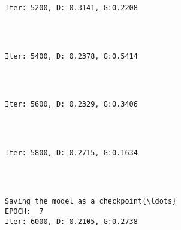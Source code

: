 \documentclass[11pt]{article}
\begin{document}
    \begin{Verbatim}[commandchars=\\\{\}]

Iter: 5200, D: 0.3141, G:0.2208
    \end{Verbatim}

    \begin{center}
    \end{center}
    { \hspace*{\fill} \\}
    
    \begin{Verbatim}[commandchars=\\\{\}]

Iter: 5400, D: 0.2378, G:0.5414
    \end{Verbatim}

    \begin{center}
    \end{center}
    { \hspace*{\fill} \\}
    
    \begin{Verbatim}[commandchars=\\\{\}]

Iter: 5600, D: 0.2329, G:0.3406
    \end{Verbatim}

    \begin{center}
    \end{center}
    { \hspace*{\fill} \\}
    
    \begin{Verbatim}[commandchars=\\\{\}]

Iter: 5800, D: 0.2715, G:0.1634
    \end{Verbatim}

    \begin{center}
    \end{center}
    { \hspace*{\fill} \\}
    
    \begin{Verbatim}[commandchars=\\\{\}]

Saving the model as a checkpoint{\ldots}
EPOCH:  7
Iter: 6000, D: 0.2105, G:0.2738
    \end{Verbatim}
\end{document}
